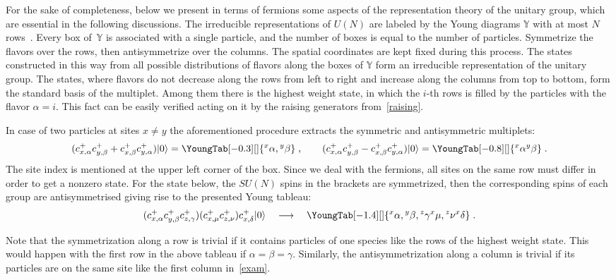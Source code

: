 \documentclass[pdftex]{sigma}
\newcommand{\yn}{\mathbb{Y}}
\begin{document}
For the sake of completeness,  below we present in terms of fermions  some aspects
of the representation theory  of the unitary group, which are essential in
the following discussions.
The irreducible representations of $U(N)$
are labeled by the Young diagrams $\yn$ with at most $N$ rows~\cite{Hamermesh}.
Every box of~$\yn$ is associated with a single particle,
and the number of boxes is equal to  the number of particles.
Symmetrize the f\/lavors over the rows, then antisymmetrize over the columns. The spatial coordinates
are kept f\/ixed during this process.
The states constructed in this way from all possible distributions of  f\/lavors along the
boxes of $\yn$  form an irreducible representation of the unitary group.
The states, where f\/lavors do not decrease along the rows from left to right
and increase along the columns from top to bottom, form the standard basis of the multiplet.
Among them there is the highest weight state, in which the $i$-th rows is f\/illed
by the particles with the f\/lavor $\alpha=i$. This fact can be easily verif\/ied acting
on it by the raising generators from~\eqref{raising}.

In case of two particles at sites $x\ne y$ the aforementioned procedure
extracts the symmetric and antisymmetric multiplets:
%
\def\YGbox{15}    %
\def\YGrule{0.4}   %
\[
(c^+_{x,\alpha}c^+_{y,\beta}+c^+_{x,\beta}c^+_{y,\alpha})|0\rangle
=
\YoungTab[-0.3][\normalsize]{ {{}^x\alpha,{}^y\beta} }
\;,
\qquad
(c^+_{x,\alpha}c^+_{y,\beta}-c^+_{x,\beta}c^+_{y,\alpha})|0\rangle
=
\YoungTab[-0.8][\normalsize]{ {{}^x\alpha}{{}^y\beta} }\;.
\]
The site index is mentioned at the upper left corner of the box.
Since we deal with the fermions, all sites on the same row must dif\/fer in order to
get a nonzero state.
For the state below, the $SU(N)$ spins in the brackets are symmetrized, then the corresponding spins
of each group are antisymmetrised giving rise to the presented Young tableau:
\begin{equation}
\label{exam}
(c^+_{x,\alpha}c^+_{y,\beta}c^+_{z,\gamma})(c^+_{x,\mu}c^+_{z,\nu})c^+_{x,\delta}|0\rangle
\quad\longrightarrow\quad
\YoungTab[-1.4][\normalsize]{ {{}^x\alpha,{}^y\beta,{}^z\gamma} {{}^x\mu,{}^z\nu } {{}^x\delta }}\;.
\end{equation}

Note that the symmetrization along a row is trivial if it contains particles of one species
like the rows of the highest weight state.
This would happen with the f\/irst row in the above tableau if $\alpha=\beta=\gamma$.
Similarly, the antisymmetrization along a column is trivial if its particles are on the same site like
the f\/irst column in~\eqref{exam}.
\end{document}

